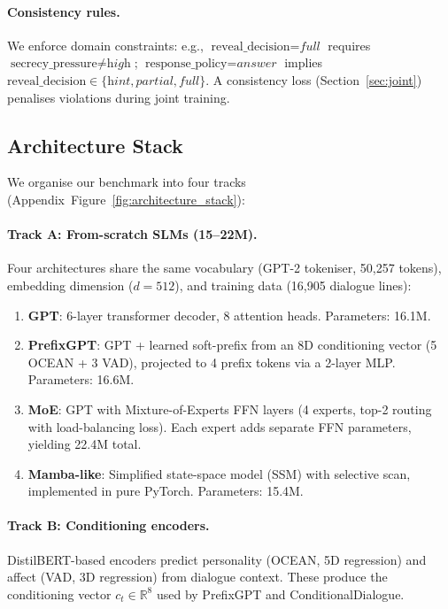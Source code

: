 \documentclass[11pt]{article}
\begin{document}
\paragraph{Consistency rules.}
We enforce domain constraints: e.g., $\text{reveal\_decision} = \textit{full}$ requires $\text{secrecy\_pressure} \neq \textit{high}$; $\text{response\_policy} = \textit{answer}$ implies $\text{reveal\_decision} \in \{\textit{hint}, \textit{partial}, \textit{full}\}$.
A consistency loss (Section~\ref{sec:joint}) penalises violations during joint training.

\subsection{Architecture Stack}
\label{sec:architectures}

We organise our benchmark into four tracks (Appendix~Figure~\ref{fig:architecture_stack}):

\paragraph{Track A: From-scratch SLMs (15--22M).}
Four architectures share the same vocabulary (GPT-2 tokeniser, 50,257 tokens), embedding dimension ($d=512$), and training data (16,905 dialogue lines):

\begin{enumerate}
    \item \textbf{GPT}: 6-layer transformer decoder, 8 attention heads. Parameters: 16.1M.
    \item \textbf{PrefixGPT}: GPT + learned soft-prefix from an 8D conditioning vector (5 OCEAN + 3 VAD), projected to 4 prefix tokens via a 2-layer MLP. Parameters: 16.6M.
    \item \textbf{MoE}: GPT with Mixture-of-Experts FFN layers (4 experts, top-2 routing with load-balancing loss). Each expert adds separate FFN parameters, yielding 22.4M total.
    \item \textbf{Mamba-like}: Simplified state-space model (SSM) with selective scan, implemented in pure PyTorch. Parameters: 15.4M.
\end{enumerate}

\paragraph{Track B: Conditioning encoders.}
DistilBERT-based encoders predict personality (OCEAN, 5D regression) and affect (VAD, 3D regression) from dialogue context.
These produce the conditioning vector $c_t \in \mathbb{R}^8$ used by PrefixGPT and ConditionalDialogue.
\end{document}

